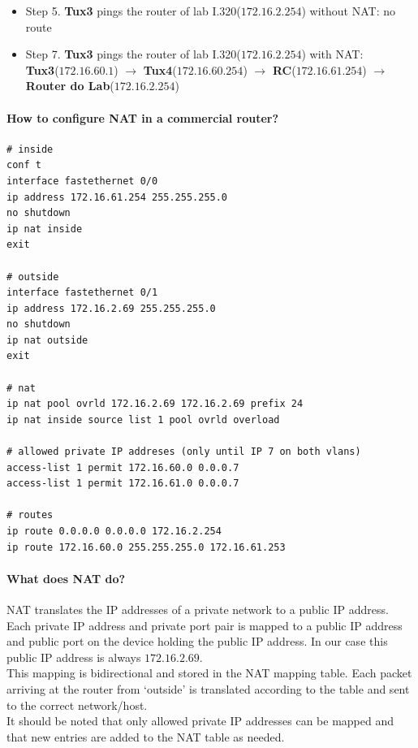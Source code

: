 \documentclass[11pt]{report}
\newcommand{\tux}[1]{\textbf{Tux#1}}
\begin{document}
\begin{itemize}
\begin{itemize}
      (every ping after the first one):\\
      \tux{2}($172.16.61.1$) $\rightarrow$ \tux{4}($172.16.61.253$) $\rightarrow$ \tux{3}($172.16.60.1$)
  \end{itemize}
  \item Step 5. \tux{3} pings the router of lab I.320($172.16.2.254$) without NAT: no route
  \item Step 7. \tux{3} pings the router of lab I.320($172.16.2.254$) with NAT:\\
    \tux{3}($172.16.60.1$) $\rightarrow$ \tux{4}($172.16.60.254$) $\rightarrow$
    \textbf{RC}($172.16.61.254$) $\rightarrow$ \textbf{Router do Lab}($172.16.2.254$)
\end{itemize}

\paragraph{How to configure NAT in a commercial router?}
\begin{lstlisting}
# inside
conf t 
interface fastethernet 0/0
ip address 172.16.61.254 255.255.255.0 
no shutdown 
ip nat inside 
exit 

# outside
interface fastethernet 0/1
ip address 172.16.2.69 255.255.255.0 
no shutdown 
ip nat outside 
exit 

# nat
ip nat pool ovrld 172.16.2.69 172.16.2.69 prefix 24 
ip nat inside source list 1 pool ovrld overload 

# allowed private IP addreses (only until IP 7 on both vlans)
access-list 1 permit 172.16.60.0 0.0.0.7 
access-list 1 permit 172.16.61.0 0.0.0.7 

# routes
ip route 0.0.0.0 0.0.0.0 172.16.2.254 
ip route 172.16.60.0 255.255.255.0 172.16.61.253 
\end{lstlisting}

\paragraph{What does NAT do?}
NAT translates the IP addresses of a private network to a public IP address.
Each private IP address and private port pair is mapped to a public IP address
and public port on the device holding the public IP address. In our case this
public IP address is always $172.16.2.69$.\\
This mapping is bidirectional and stored in the NAT mapping table. Each packet
arriving at the router from `outside' is translated according to the table
and sent to the correct network/host.\\
It should be noted that only allowed private IP addresses can be mapped and that
new entries are added to the NAT table as needed.
\end{document}
